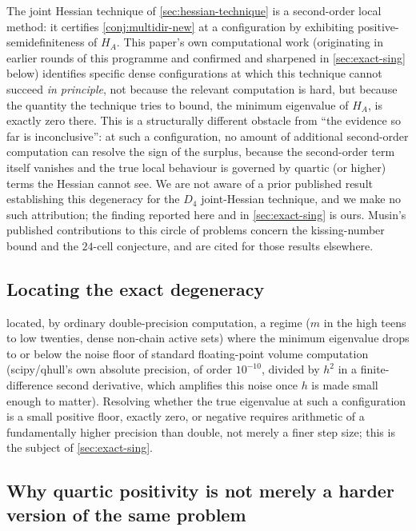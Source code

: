 \documentclass[11pt,reqno]{amsart}
\renewcommand{\_}{\origunderscore\allowbreak}
\numberwithin{equation}{section}
\theoremstyle{plain}
\theoremstyle{definition}
\theoremstyle{remark}
\begin{document}
The joint Hessian technique of \cref{sec:hessian-technique} is a
second-order local method: it certifies \cref{conj:multidir-new} at a
configuration by exhibiting positive-semidefiniteness of $H_A$. This
paper's own computational work (originating in earlier rounds of this
programme and confirmed and sharpened in \cref{sec:exact-sing} below)
identifies specific dense configurations at which this technique cannot
succeed \emph{in principle}, not because the relevant computation is
hard, but because the quantity the technique tries to bound, the
minimum eigenvalue of $H_A$, is exactly zero there. This is a
structurally different obstacle from ``the evidence so far is
inconclusive'': at such a configuration, no amount of additional
second-order computation can resolve the sign of the surplus, because
the second-order term itself vanishes and the true local behaviour is
governed by quartic (or higher) terms the Hessian cannot see. We are not aware of a prior published result establishing this
degeneracy for the $D_4$ joint-Hessian technique, and we make no such
attribution; the finding reported here and in \cref{sec:exact-sing} is
ours. Musin's published contributions to this circle of problems
\cite{Mus08,Mus18} concern the kissing-number bound and the
$24$-cell conjecture, and are cited for those results elsewhere.

\subsection{Locating the exact degeneracy}

 located, by ordinary double-precision
computation, a regime ($m$ in the high teens to low twenties, dense
non-chain active sets) where the minimum eigenvalue drops to or below
the noise floor of standard floating-point volume computation
(scipy/qhull's own absolute precision, of order $10^{-10}$, divided by
$h^2$ in a finite-difference second derivative, which amplifies this
noise once $h$ is made small enough to matter). Resolving whether the
true eigenvalue at such a configuration is a small positive floor,
exactly zero, or negative requires arithmetic of a fundamentally higher
precision than double, not merely a finer step size; this is the
subject of \cref{sec:exact-sing}.

\subsection{Why quartic positivity is not merely a harder version of the same problem}\label{sec:quartic-hardness-new}
\end{document}

